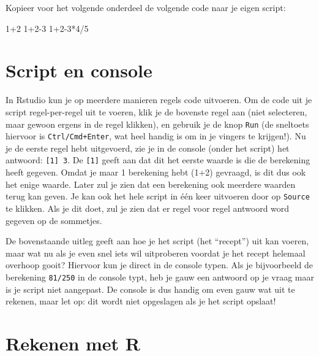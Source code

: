 \documentclass[
  a4paper,
]{scrbook}
\newenvironment{Shaded}{\begin{snugshade}}{\end{snugshade}}
\newcommand{\DecValTok}[1]{\textcolor[rgb]{0.68,0.00,0.00}{#1}}
\newcommand{\SpecialCharTok}[1]{\textcolor[rgb]{0.37,0.37,0.37}{#1}}
\theoremstyle{definition}
\theoremstyle{remark}
\begin{document}
Kopieer voor het volgende onderdeel de volgende code naar je eigen
script:

\begin{Shaded}
\begin{Highlighting}[]
\DecValTok{1}\SpecialCharTok{+}\DecValTok{2}
\DecValTok{1}\SpecialCharTok{+}\DecValTok{2{-}3}
\DecValTok{1}\SpecialCharTok{+}\DecValTok{2{-}3}\SpecialCharTok{*}\DecValTok{4}\SpecialCharTok{/}\DecValTok{5}
\end{Highlighting}
\end{Shaded}

\hypertarget{script-en-console}{%
\section{Script en console}\label{script-en-console}}

In Rstudio kun je op meerdere manieren regels code uitvoeren. Om de code
uit je script regel-per-regel uit te voeren, klik je de bovenste regel
aan (niet selecteren, maar gewoon ergens in de regel klikken), en
gebruik je de knop \texttt{Run} (de sneltoets hiervoor is
\texttt{Ctrl/Cmd+Enter}, wat heel handig is om in je vingers te
krijgen!). Nu je de eerste regel hebt uitgevoerd, zie je in de console
(onder het script) het antwoord: \texttt{{[}1{]}\ 3}. De
\texttt{{[}1{]}} geeft aan dat dit het eerste waarde is die de
berekening heeft gegeven. Omdat je maar 1 berekening hebt (1+2)
gevraagd, is dit dus ook het enige waarde. Later zul je zien dat een
berekening ook meerdere waarden terug kan geven. Je kan ook het hele
script in één keer uitvoeren door op \texttt{Source} te klikken. Als je
dit doet, zul je zien dat er regel voor regel antwoord word gegeven op
de sommetjes.

De bovenstaande uitleg geeft aan hoe je het script (het ``recept'') uit
kan voeren, maar wat nu als je even snel iets wil uitproberen voordat je
het recept helemaal overhoop gooit? Hiervoor kun je direct in de console
typen. Als je bijvoorbeeld de berekening \texttt{81/250} in de console
typt, heb je gauw een antwoord op je vraag maar is je script niet
aangepast. De console is dus handig om even gauw wat uit te rekenen,
maar let op: dit wordt niet opgeslagen als je het script opslaat!

\hypertarget{rekenen-met-r}{%
\section{Rekenen met R}\label{rekenen-met-r}}
\end{document}
